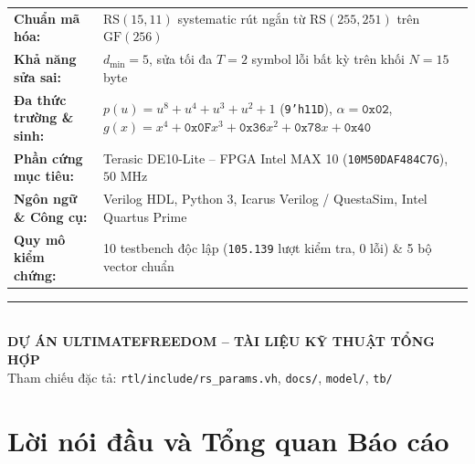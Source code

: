 \documentclass[11pt,a4paper]{report}
\begin{document}
\begin{titlepage}
    \begin{tcolorbox}[
        width=0.90\textwidth,
        colback=boxbg,
        colframe=primaryblue,
        boxrule=0.8pt,
        arc=4pt,
        left=10pt,
        right=10pt,
        top=8pt,
        bottom=8pt
    ]
        \small
        \renewcommand{\arraystretch}{1.25}
        \begin{tabularx}{\linewidth}{@{}>{\bfseries\color{primaryblue}}l X@{}}
            Chuẩn mã hóa: & $\text{RS}(15,11)$ systematic rút ngắn từ $\text{RS}(255,251)$ trên $\text{GF}(256)$ \\
            Khả năng sửa sai: & $d_{\min} = 5$, sửa tối đa $T = 2$ symbol lỗi bất kỳ trên khối $N = 15$ byte \\
            Đa thức trường \& sinh: & $p(u) = u^8 + u^4 + u^3 + u^2 + 1$ (\texttt{9'h11D}), $\alpha = \texttt{0x02}$, $g(x) = x^4 + \texttt{0x0F}x^3 + \texttt{0x36}x^2 + \texttt{0x78}x + \texttt{0x40}$ \\
            Phần cứng mục tiêu: & Terasic DE10-Lite -- FPGA Intel MAX 10 (\texttt{10M50DAF484C7G}), $50\text{ MHz}$ \\
            Ngôn ngữ \& Công cụ: & Verilog HDL, Python 3, Icarus Verilog / QuestaSim, Intel Quartus Prime \\
            Quy mô kiểm chứng: & 10 testbench độc lập (\texttt{105.139} lượt kiểm tra, 0 lỗi) \& 5 bộ vector chuẩn
        \end{tabularx}
    \end{tcolorbox}

    \vfill
    \rule{0.45\textwidth}{0.5pt}\\[0.3cm]
    {\normalsize\bfseries\color{primaryblue} DỰ ÁN ULTIMATEFREEDOM -- TÀI LIỆU KỸ THUẬT TỔNG HỢP}\\[0.15cm]
    {\small\color{mutedgray} Tham chiếu đặc tả: \texttt{rtl/include/rs\_params.vh}, \texttt{docs/}, \texttt{model/}, \texttt{tb/}}
    \vspace*{0.6cm}
\end{titlepage}
\hypersetup{pageanchor=true}


\chapter*{Lời nói đầu và Tổng quan Báo cáo}
\end{document}
